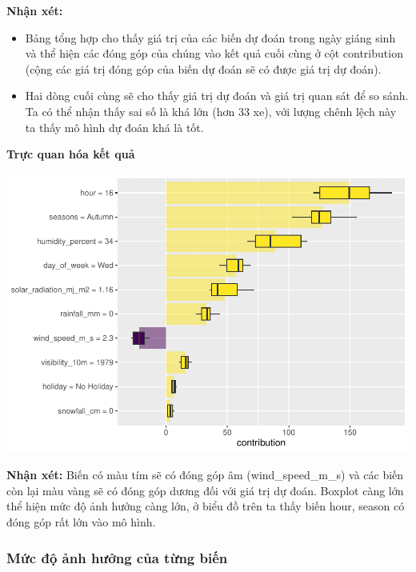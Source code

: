 \documentclass[
  11pt,
  letterpaper,
]{article}
\begin{document}
\textbf{Nhận xét:}

\begin{itemize}
\item Bảng tổng hợp cho thấy giá trị của các biến dự đoán trong ngày giáng sinh và thể hiện các đóng góp của chúng vào kết quả cuối cùng ở cột contribution (cộng các giá trị đóng góp của biến dự đoán sẽ có được giá trị dự đoán).
\item Hai dòng cuối cùng sẽ cho thấy giá trị dự đoán và giá trị quan sát để so sánh. Ta có thể nhận thấy sai số là khá lớn (hơn 33 xe), với lượng chênh lệch này ta thấy mô hình dự đoán khá là tốt.
\end{itemize}

\textbf{Trực quan hóa kết quả}

\begin{center}\includegraphics[width=1.2\linewidth,]{Final_Project_files/figure-latex/unnamed-chunk-49-1} \end{center}

\textbf{Nhận xét:} Biến có màu tím sẽ có đóng góp âm (wind\_speed\_m\_s) và các biến còn lại màu vàng sẽ có đóng góp dương đối với giá trị dự đoán. Boxplot càng lớn thể hiện mức độ ảnh hưởng càng lớn, ở biểu đồ trên ta thấy biến hour, season có đóng góp rất lớn vào mô hình.

\subsubsection{Mức độ ảnh hưởng của từng biến}
\end{document}
